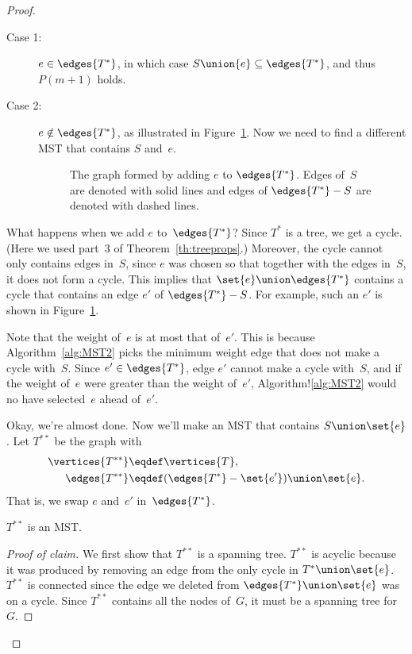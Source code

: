\begin{proof}
\begin{description}
\item[Case 1:] $e \in \edges{T^*}$, in which case $S \union \{e\}
  \subseteq \edges{T^*}$, and thus $P(m+1)$ holds.

\item[Case 2:]
$e \notin \edges{T^*}$, as illustrated in Figure~\ref{fig:5KD}.  Now we need
  to find a different MST that contains $S$ and~$e$.

\begin{figure}


\caption{The graph formed by adding $e$ to $\edges{T^*}$.  Edges of~$S$ are
  denoted with solid lines and edges of $\edges{T^*} - S$ are denoted with
  dashed lines.}

\label{fig:5KD}
\end{figure}

\end{description}

What happens when we add $e$ to~$\edges{T^*}$?  Since $T^*$ is a tree,
we get a cycle.  (Here we used part~3 of Theorem~\ref{th:treeprops}.)
Moreover, the cycle cannot only contains edges in~$S$, since $e$ was
chosen so that together with the edges in~$S$, it does not form a
cycle.  This implies that $\set{e} \union \edges{T^*}$ contains a
cycle that contains an edge $e'$ of $\edges{T^*} - S$.  For example,
such an $e'$ is shown in Figure~\ref{fig:5KD}.

Note that the weight of~$e$ is at most that of~$e'$.  This is because
Algorithm~\ref{alg:MST2} picks the minimum weight edge that does not
make a cycle with~$S$.  Since $e' \in \edges{T^*}$, edge $e'$ cannot
make a cycle with~$S$, and if the weight of~$e$ were greater than the
weight of~$e'$, Algorithm!\ref{alg:MST2} would no have selected~$e$
ahead of~$e'$.

Okay, we're almost done.  Now we'll make an MST that contains $S
\union \set{e}$.  Let $T^{**}$ be the graph with
\begin{align*}
\vertices{T^{**}} & \eqdef \vertices{T},\\
\edges{T^{**}} & \eqdef (\edges{T^*} - \set{e'}) \union \set{e}.
\end{align*}
That is, we swap $e$ and~$e'$ in~$\edges{T^*}$.

\begin{claim}\label{claim:MST2}
$T^{**}$ is an MST.
\end{claim}

\begin{proof}[Proof of claim]
We first show that $T^{**}$ is a spanning tree.  $T^{**}$ is acyclic
because it was produced by removing an edge from the only cycle in
$T^{*} \union \set{e}$.  $T^{**}$ is connected since the edge we
deleted from $\edges{T^*} \union \set{e}$ was on a cycle.  Since
$T^{**}$ contains all the nodes of~$G$, it must be a spanning tree
for~$G$.


\end{proof}
\end{proof}

